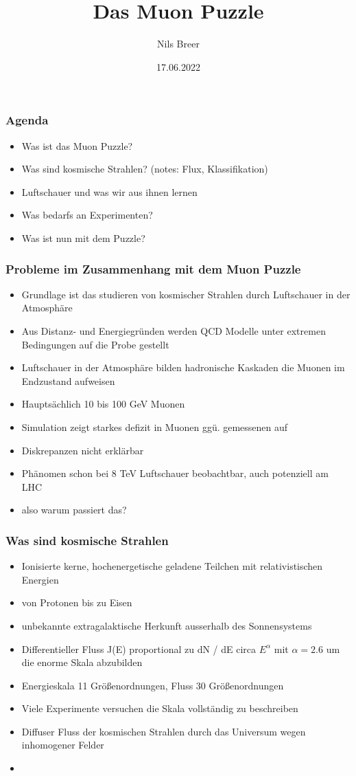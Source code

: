 \documentclass[aspectratio=1610, 9pt]{beamer}
\title{Das Muon Puzzle}
\author[N.Breer]{Nils Breer}
\institute{Fakultät Physik}
\date{17.06.2022}
\begin{document}
\maketitle

\begin{frame}\frametitle{Agenda}
  \begin{itemize}
    \item Was ist das Muon Puzzle?
    \item Was sind kosmische Strahlen? (notes: Flux, Klassifikation)
    \item Luftschauer und was wir aus ihnen lernen
    \item Was bedarfs an Experimenten?
    \item Was ist nun mit dem Puzzle?
  \end{itemize}
\end{frame}

\begin{frame}\frametitle{Probleme im Zusammenhang mit dem Muon Puzzle}
  \begin{itemize}
    \item Grundlage ist das studieren von kosmischer Strahlen durch Luftschauer
    in der Atmosphäre
    \item Aus Distanz- und Energiegr\"unden werden QCD Modelle unter extremen
    Bedingungen auf die Probe gestellt
    \item Luftschauer in der Atmosphäre bilden hadronische Kaskaden die Muonen
    im Endzustand aufweisen
    \item Hauptsächlich 10 bis 100 GeV Muonen
    \item Simulation zeigt starkes defizit in Muonen gg\"u. gemessenen auf
    \item Diskrepanzen nicht erklärbar
    \item Phänomen schon bei 8 TeV Luftschauer beobachtbar, auch potenziell am LHC
    \item also warum passiert das?
  \end{itemize}
\end{frame}

\begin{frame}\frametitle{Was sind kosmische Strahlen}
  \begin{itemize}
    \item Ionisierte kerne, hochenergetische geladene Teilchen mit relativistischen
    Energien
    \item von Protonen bis zu Eisen
    \item unbekannte extragalaktische Herkunft ausserhalb des Sonnensystems
    \item Differentieller Fluss J(E) proportional zu dN / dE circa $E^\alpha$
    mit $\alpha = 2.6$ um die enorme Skala abzubilden
    \item Energieskala 11 Größenordnungen, Fluss 30 Größenordnungen
    \item Viele Experimente versuchen die Skala vollständig zu beschreiben
    \item Diffuser Fluss der kosmischen Strahlen durch das Universum wegen 
    inhomogener Felder
    \item
  \end{itemize}
\end{frame}
\end{document}
